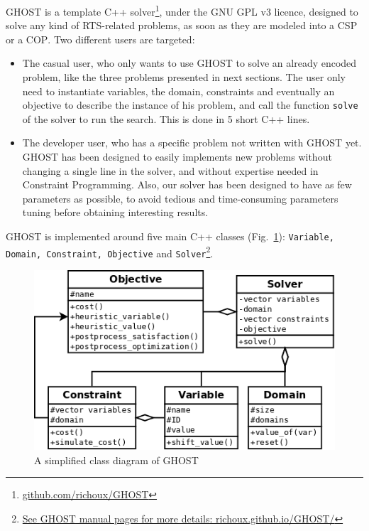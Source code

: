 \documentclass[journal]{IEEEtran}
\newcommand{\csp}{\textsc{CSP}\xspace}
\newcommand{\cop}{\textsc{COP}\xspace}
\newcommand{\ghost}{\textsc{GHOST}\xspace}
\begin{document}
\ghost             is            a             template            C++
solver\footnote{\href{https://github.com/richoux/GHOST}{github.com/richoux/GHOST}},
under  the  GNU  GPL  v3  licence,  designed  to  solve  any  kind  of
RTS-related problems,  as soon as  they are modeled  into a \csp  or a
\cop. Two different users are targeted:
\begin{itemize}
\item  The casual  user, who  only wants  to use  \ghost to  solve an
  already encoded problem,  like the three problems  presented in next
  sections.  The user only need  to instantiate variables, the domain,
  constraints and eventually an objective  to describe the instance of
  his problem, and  call the function \texttt{solve} of  the solver to
  run the  search. This is  done in 5 short  C++ lines.
\item The developer user, who has  a specific problem not written with
  \ghost  yet.  \ghost  has  been designed  to  easily implements  new
  problems without changing  a single line in the  solver, and without
  expertise needed  in Constraint  Programming.  Also, our  solver has
  been  designed to  have  as  few parameters  as  possible, to  avoid
  tedious  and  time-consuming   parameters  tuning  before  obtaining
  interesting results.
\end{itemize}

\ghost    is    implemented    around   five    main    C++    classes
(Fig.~\ref{fig:ghost}):    \texttt{Variable,    Domain,    Constraint,
  Objective}                                                       and
\texttt{Solver}\footnote{\href{http://richoux.github.io/GHOST/}{See
    \ghost manual pages for more details: richoux.github.io/GHOST/}}.
\begin{figure}[tba]
  \centering
  \includegraphics[width=\columnwidth]{figs/ghost.png}
  \caption{A simplified class diagram of \ghost}
  \label{fig:ghost}
\end{figure}
\end{document}
